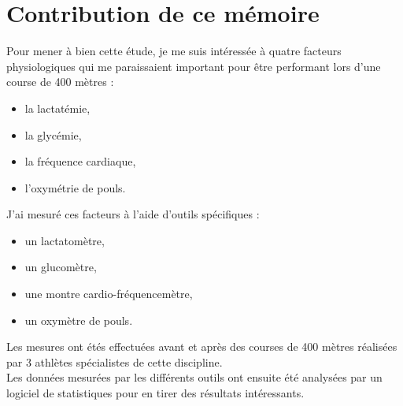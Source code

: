 \chapter*{Contribution de ce mémoire}
\label{chap:contribution}

Pour mener à bien cette étude, je me suis intéressée à quatre facteurs physiologiques qui me paraissaient important pour être performant lors d'une course de 400 mètres : 
\begin{itemize}
    \item la lactatémie,
    \item la glycémie,
    \item la fréquence cardiaque,
    \item l'oxymétrie de pouls.\\
\end{itemize}


J'ai mesuré ces facteurs à l'aide d'outils spécifiques : 
\begin{itemize}
    \item un lactatomètre,
    \item un glucomètre,
    \item une montre cardio-fréquencemètre,
    \item un oxymètre de pouls.\\
\end{itemize}

Les mesures ont étés effectuées avant et après des courses de 400 mètres réalisées par 3 athlètes spécialistes de cette discipline. \\

Les données mesurées par les différents outils ont ensuite été analysées par un logiciel de statistiques pour en tirer des résultats intéressants. \\


        
